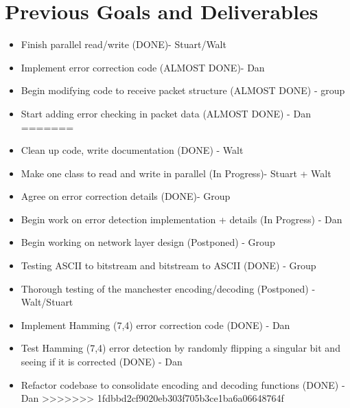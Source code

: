 \documentclass{article}
\begin{document}
\section*{Previous Goals and Deliverables}
\begin{itemize}
<<<<<<< HEAD
    \item Finish parallel read/write (DONE)- Stuart/Walt
    \item Implement error correction code (ALMOST DONE)- Dan
    \item Begin modifying code to receive packet structure (ALMOST DONE) - group
    \item Start adding error checking in packet data (ALMOST DONE) - Dan
=======
    \item Clean up code, write documentation (DONE) - Walt
    \item Make one class to read and write in parallel (In Progress)- Stuart + Walt
    \item Agree on error correction details (DONE)- Group
    \item Begin work on error detection implementation + details (In Progress) - Dan
    \item Begin working on network layer design (Postponed) - Group
    \item Testing ASCII to bitstream and bitstream to ASCII (DONE) - Group
    \item Thorough testing of the manchester encoding/decoding (Postponed) - Walt/Stuart


    \item Implement Hamming (7,4) error correction code (DONE) - Dan
    \item Test Hamming (7,4) error detection by randomly flipping a singular bit and seeing if it is corrected (DONE) - Dan
    \item Refactor codebase to consolidate encoding and decoding functions (DONE) - Dan
>>>>>>> 1fdbbd2cf9020eb303f705b3ce1ba6a06648764f
\end{itemize}

\end{document}
